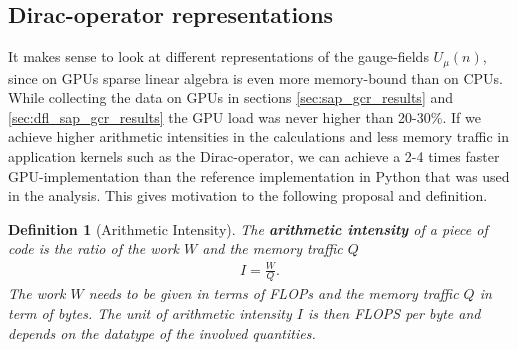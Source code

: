 \documentclass{article}
\theoremstyle{plain} %
\newtheorem{definition}{Definition}[section]
\theoremstyle{convention} %
\theoremstyle{remark} %
\def\df#1{\textbf{\textit{#1}}}
\numberwithin{equation}{section}
\begin{document}

\subsection{Dirac-operator representations}

It makes sense to look at different representations of the gauge-fields $U_{\mu}(n)$, since on GPUs sparse linear algebra is even more memory-bound than on CPUs. While collecting the data on GPUs in sections \ref{sec:sap_gcr_results} and \ref{sec:dfl_sap_gcr_results} the GPU load was never higher than \num{20}-\num{30}\%. If we achieve higher arithmetic intensities in the calculations and less memory traffic in application kernels such as the Dirac-operator, we can achieve a \num{2}-\num{4} times faster GPU-implementation than the reference implementation in Python that was used in the analysis. This gives motivation to the following proposal and definition.

\begin{definition}[Arithmetic Intensity]
  The \df{arithmetic intensity} of a piece of code is the ratio of the work $W$ and the memory traffic $Q$
  \begin{align*}
    I = \frac{W}{Q}.
  \end{align*}
  The work $W$ needs to be given in terms of \acrfull{FLOPs} and the memory traffic $Q$ in term of bytes. The unit of arithmetic intensity $I$ is then FLOPS per byte and depends on the datatype of the involved quantities.
\end{definition}
\end{document}
